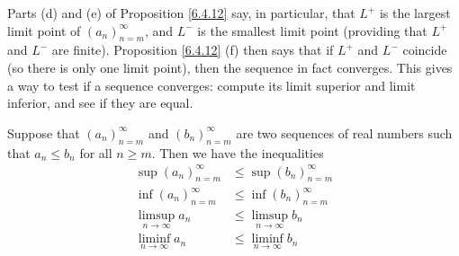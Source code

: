 \begin{note}
    Parts (d) and (e) of Proposition \ref{6.4.12} say, in particular, that \(L^+\) is the largest limit point of \((a_n)_{n = m}^\infty\), and \(L^-\) is the smallest limit point
    (providing that \(L^+\) and \(L^-\) are finite).
    Proposition \ref{6.4.12} (f) then says that if \(L^+\) and \(L^-\) coincide (so there is only one limit point), then the sequence in fact converges.
    This gives a way to test if a sequence converges: compute its limit superior and limit inferior, and see if they are equal.
\end{note}

\begin{lemma}\label{6.4.13}
    Suppose that \((a_n)_{n = m}^\infty\) and \((b_n)_{n = m}^\infty\) are two sequences of real numbers such that \(a_n \leq b_n\) for all \(n \geq m\).
    Then we have the inequalities
    \begin{align*}
        \sup(a_n)_{n = m}^\infty   & \leq \sup(b_n)_{n = m}^\infty   \\
        \inf(a_n)_{n = m}^\infty   & \leq \inf(b_n)_{n = m}^\infty   \\
        \limsup_{n \to \infty} a_n & \leq \limsup_{n \to \infty} b_n \\
        \liminf_{n \to \infty} a_n & \leq \liminf_{n \to \infty} b_n
    \end{align*}
\end{lemma}

